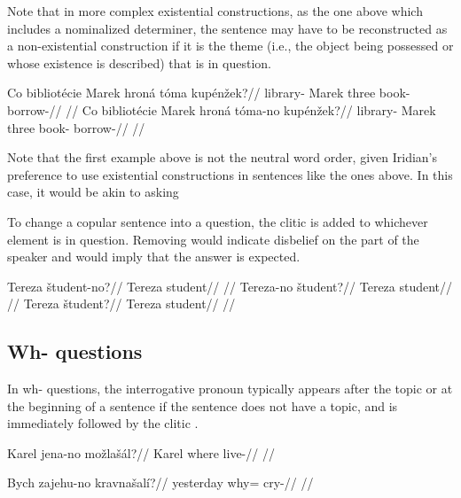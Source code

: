 Note that in more complex existential constructions, as the one above which includes a nominalized determiner, the sentence may have to be reconstructed as a non-existential construction if it is the theme (i.e., the object being possessed or whose existence is described) that is in question.

\pex
\a
\begingl
\gla Co bibliot\'ecie Marek hron\'a t\'oma kup\'en\v{z}ek?//
\glb {} library- Marek three book- borrow-//
\glft {}//
\endgl
\a
\begingl
\gla Co bibliot\'ecie Marek hron\'a t\'oma-no kup\'en\v{z}ek?//
\glb {} library- Marek three book- borrow-//
\glft {}//
\endgl
\xe

Note that the first example above is not the neutral word order, given Iridian's preference to use existential constructions in sentences like the ones above. In this case, it would be akin to asking 

To change a copular sentence into a question, the clitic  is added to whichever element is in question. Removing  would indicate disbelief on the part of the speaker and would imply that the answer  is expected.

\pex
\a
\begingl
\gla Tereza \v{s}tudent-no?//
\glb Tereza student//
\glft {}//
\endgl
\a
\begingl
\gla Tereza-no \v{s}tudent?//
\glb Tereza student//
\glft {}//
\endgl
\a
\begingl
\gla Tereza \v{s}tudent?//
\glb Tereza student//
\glft {}//
\endgl
\xe

\subsection{Wh- questions}\label{sec:ynquestions}
In wh- questions, the interrogative pronoun typically appears after the topic or at the beginning of a sentence if the sentence does not have a topic, and is immediately followed by the clitic .

\pex
\begingl
\gla Karel jena-no mo\v{z}la\v{s}\'al?//
\glb Karel where live-//
\glft {}//
\endgl
\xe

\pex
\begingl
\gla Bych zajehu-no kravna\v{s}al\'i?//
\glb yesterday why= cry-//
\glft {}//
\endgl
\xe


